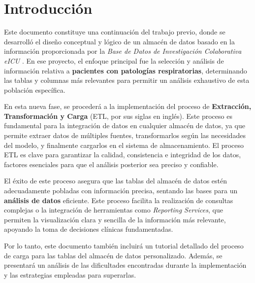 \documentclass[12pt, a4paper, twoside]{article}
\begin{document}
	
	
	
	\clearpage
	\setcounter{page}{1}
	
	
	
	\tableofcontents
	\newpage
	
	\section{Introducción}
	
	Este documento constituye una continuación del trabajo previo, donde se desarrolló el diseño conceptual y lógico de un almacén de datos basado en la información proporcionada por la \textit{Base de Datos de Investigación Colaborativa eICU} \cite{eICU2024}. En ese proyecto, el enfoque principal fue la selección y análisis de información relativa a \textbf{pacientes con patologías respiratorias}, determinando las tablas y columnas más relevantes para permitir un análisis exhaustivo de esta población específica.
	
	En esta nueva fase, se procederá a la implementación del proceso de \textbf{Extracción, Transformación y Carga} (ETL, por sus siglas en inglés). Este proceso es fundamental para la integración de datos en cualquier almacén de datos, ya que permite extraer datos de múltiples fuentes, transformarlos según las necesidades del modelo, y finalmente cargarlos en el sistema de almacenamiento. El proceso ETL es clave para garantizar la calidad, consistencia e integridad de los datos, factores esenciales para que el análisis posterior sea preciso y confiable.
	
	El éxito de este proceso asegura que las tablas del almacén de datos estén adecuadamente pobladas con información precisa, sentando las bases para un \textbf{análisis de datos} eficiente. Este proceso facilita la realización de consultas complejas o la integración de herramientas como \textit{Reporting Services}, que permiten la visualización clara y sencilla de la información más relevante, apoyando la toma de decisiones clínicas fundamentadas.
	
	Por lo tanto, este documento también incluirá un tutorial detallado del proceso de carga para las tablas del almacén de datos personalizado. Además, se presentará un análisis de las dificultades encontradas durante la implementación y las estrategias empleadas para superarlas.
	
\end{document}
